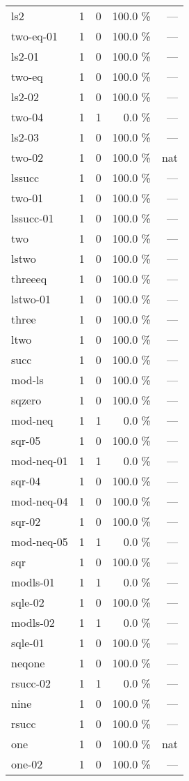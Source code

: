 \documentclass[a4paper]{article}
\begin{document}
\begin{supertabular}{l|r|r|r|r}
ls2 & 1 & 0 & 100.0 \% & ---\\
two-eq-01 & 1 & 0 & 100.0 \% & ---\\
ls2-01 & 1 & 0 & 100.0 \% & ---\\
two-eq & 1 & 0 & 100.0 \% & ---\\
ls2-02 & 1 & 0 & 100.0 \% & ---\\
two-04 & 1 & 1 & 0.0 \% & ---\\
ls2-03 & 1 & 0 & 100.0 \% & ---\\
two-02 & 1 & 0 & 100.0 \% & nat\\
lssucc & 1 & 0 & 100.0 \% & ---\\
two-01 & 1 & 0 & 100.0 \% & ---\\
lssucc-01 & 1 & 0 & 100.0 \% & ---\\
two & 1 & 0 & 100.0 \% & ---\\
lstwo & 1 & 0 & 100.0 \% & ---\\
threeeq & 1 & 0 & 100.0 \% & ---\\
lstwo-01 & 1 & 0 & 100.0 \% & ---\\
three & 1 & 0 & 100.0 \% & ---\\
ltwo & 1 & 0 & 100.0 \% & ---\\
succ & 1 & 0 & 100.0 \% & ---\\
mod-ls & 1 & 0 & 100.0 \% & ---\\
sqzero & 1 & 0 & 100.0 \% & ---\\
mod-neq & 1 & 1 & 0.0 \% & ---\\
sqr-05 & 1 & 0 & 100.0 \% & ---\\
mod-neq-01 & 1 & 1 & 0.0 \% & ---\\
sqr-04 & 1 & 0 & 100.0 \% & ---\\
mod-neq-04 & 1 & 0 & 100.0 \% & ---\\
sqr-02 & 1 & 0 & 100.0 \% & ---\\
mod-neq-05 & 1 & 1 & 0.0 \% & ---\\
sqr & 1 & 0 & 100.0 \% & ---\\
modls-01 & 1 & 1 & 0.0 \% & ---\\
sqle-02 & 1 & 0 & 100.0 \% & ---\\
modls-02 & 1 & 1 & 0.0 \% & ---\\
sqle-01 & 1 & 0 & 100.0 \% & ---\\
neqone & 1 & 0 & 100.0 \% & ---\\
rsucc-02 & 1 & 1 & 0.0 \% & ---\\
nine & 1 & 0 & 100.0 \% & ---\\
rsucc & 1 & 0 & 100.0 \% & ---\\
one & 1 & 0 & 100.0 \% & nat\\
one-02 & 1 & 0 & 100.0 \% & ---\\

\end{supertabular}
\end{document}
